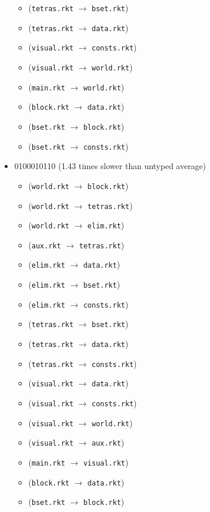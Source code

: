 \documentclass{article}
\newcommand{\mono}[1]{\texttt{#1}}
\begin{document}
\begin{itemize}
\begin{itemize}
  \item (\mono{tetras.rkt} $\rightarrow$ \mono{bset.rkt})
  \item (\mono{tetras.rkt} $\rightarrow$ \mono{data.rkt})
  \item (\mono{visual.rkt} $\rightarrow$ \mono{consts.rkt})
  \item (\mono{visual.rkt} $\rightarrow$ \mono{world.rkt})
  \item (\mono{main.rkt} $\rightarrow$ \mono{world.rkt})
  \item (\mono{block.rkt} $\rightarrow$ \mono{data.rkt})
  \item (\mono{bset.rkt} $\rightarrow$ \mono{block.rkt})
  \item (\mono{bset.rkt} $\rightarrow$ \mono{consts.rkt})
  \end{itemize}
\item 0100010110 (1.43 times slower than untyped average)
  \begin{itemize}
  \item (\mono{world.rkt} $\rightarrow$ \mono{block.rkt})
  \item (\mono{world.rkt} $\rightarrow$ \mono{tetras.rkt})
  \item (\mono{world.rkt} $\rightarrow$ \mono{elim.rkt})
  \item (\mono{aux.rkt} $\rightarrow$ \mono{tetras.rkt})
  \item (\mono{elim.rkt} $\rightarrow$ \mono{data.rkt})
  \item (\mono{elim.rkt} $\rightarrow$ \mono{bset.rkt})
  \item (\mono{elim.rkt} $\rightarrow$ \mono{consts.rkt})
  \item (\mono{tetras.rkt} $\rightarrow$ \mono{bset.rkt})
  \item (\mono{tetras.rkt} $\rightarrow$ \mono{data.rkt})
  \item (\mono{tetras.rkt} $\rightarrow$ \mono{consts.rkt})
  \item (\mono{visual.rkt} $\rightarrow$ \mono{data.rkt})
  \item (\mono{visual.rkt} $\rightarrow$ \mono{consts.rkt})
  \item (\mono{visual.rkt} $\rightarrow$ \mono{world.rkt})
  \item (\mono{visual.rkt} $\rightarrow$ \mono{aux.rkt})
  \item (\mono{main.rkt} $\rightarrow$ \mono{visual.rkt})
  \item (\mono{block.rkt} $\rightarrow$ \mono{data.rkt})
  \item (\mono{bset.rkt} $\rightarrow$ \mono{block.rkt})

\end{itemize}
\end{itemize}
\end{document}
